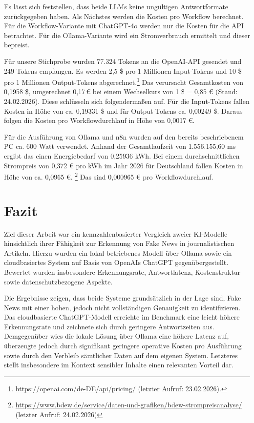 \documentclass[12pt,a4paper]{article}
\begin{document}
    Es lässt sich feststellen, dass beide LLMs keine ungültigen Antwortformate zurückgegeben haben. \newline
    Als Nächstes werden die Kosten pro Workflow berechnet. Für die Workflow-Variante mit ChatGPT-4o werden nur die Kosten
    für die API betrachtet. Für die Ollama-Variante wird ein Stromverbrauch ermittelt und dieser bepreist.

    Für unsere Stichprobe wurden 77.324 Tokens an die OpenAI-API gesendet und 249 Tokens empfangen.
    Es werden 2,5 \$ pro 1 Millionen Input-Tokens und 10 \$ pro 1 Millionen Output-Tokens abgerechnet.\footnote{\url{https://openai.com/de-DE/api/pricing/} (letzter Aufruf: 23.02.2026).}
    Das verursacht Gesamtkosten von 0,1958 \$, umgerechnet 0,17\,€ bei einem Wechselkurs von 1 \$ = 0,85 € (Stand: 24.02.2026).
    Diese schlüsseln sich folgendermaßen auf. Für die Input-Tokens fallen Kosten in Höhe von ca. 0,19331 \$ und für Output-Tokens ca. 0,00249 \$.
    Daraus folgen die Kosten pro Workflowdurchlauf in Höhe von 0,0017 €.


    Für die Ausführung von Ollama und n8n wurden auf den bereits beschriebenem PC ca. 600 Watt verwendet. Anhand der
    Gesamtlaufzeit von 1.556.155,60 ms ergibt das einen Energiebedarf von 0,25936 kWh. Bei einem durchschnittlichen
    Strompreis von 0,372 € pro kWh im Jahr 2026 für Deutschland fallen Kosten in Höhe von ca. 0,0965 €. \footnote{\url{https://www.bdew.de/service/daten-und-grafiken/bdew-strompreisanalyse/} (letzter Aufruf: 24.02.2026)}
    Das sind 0,000965 € pro Workflowdurchlauf.

    \clearpage
    \section{Fazit}
    Ziel dieser Arbeit war ein kennzahlenbasierter Vergleich
    zweier KI-Modelle hinsichtlich ihrer Fähigkeit zur Erkennung von Fake News in
    journalistischen Artikeln. Hierzu wurden ein lokal betriebenes Modell über
    Ollama sowie ein cloudbasiertes System auf Basis von OpenAIs ChatGPT
    gegenübergestellt. Bewertet wurden insbesondere Erkennungsrate, Antwortlatenz,
    Kostenstruktur sowie datenschutzbezogene Aspekte.

    Die Ergebnisse zeigen, dass beide Systeme grundsätzlich
    in der Lage sind, Fake News mit einer hohen, jedoch nicht vollständigen
    Genauigkeit zu identifizieren. Das cloudbasierte ChatGPT-Modell erreichte im
    Benchmark eine leicht höhere Erkennungsrate und zeichnete sich durch geringere
    Antwortzeiten aus. Demgegenüber wies die lokale Lösung über Ollama eine höhere
    Latenz auf, überzeugte jedoch durch signifikant geringere operative Kosten pro
    Ausführung sowie durch den Verbleib sämtlicher Daten auf dem eigenen System.
    Letzteres stellt insbesondere im Kontext sensibler Inhalte einen relevanten
    Vorteil dar.
\end{document}

